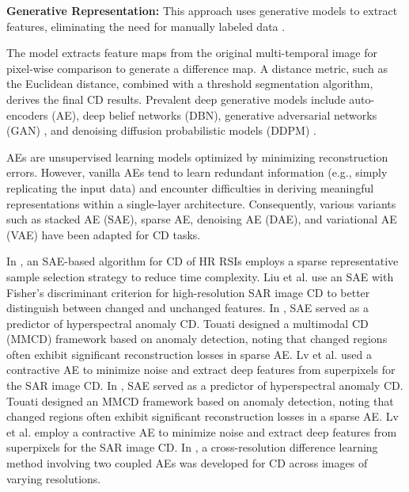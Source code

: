 \textbf{Generative Representation:} This approach uses generative models to extract features, eliminating the need for manually labeled data \cite{hong2024multimodal}.

The model extracts feature maps from the original multi-temporal image for pixel-wise comparison to generate a difference map. A distance metric, such as the Euclidean distance, combined with a threshold segmentation algorithm, derives the final CD results. Prevalent deep generative models include auto-encoders (AE), deep belief networks (DBN), generative adversarial networks (GAN) \cite{Goodfellow2014Generative}, and denoising diffusion probabilistic models (DDPM) \cite{Jonathan2020Denoising}.

\par AEs are unsupervised learning models optimized by minimizing reconstruction errors. However, vanilla AEs tend to learn redundant information (e.g., simply replicating the input data) and encounter difficulties in deriving meaningful representations within a single-layer architecture. Consequently, various variants such as stacked AE (SAE), sparse AE, denoising AE (DAE), and variational AE (VAE) have been adapted for CD tasks.

In \cite{Chen2019Fast}, an SAE-based algorithm for CD of HR RSIs employs a sparse representative sample selection strategy to reduce time complexity. Liu et al. \cite{Liu2019Stacked} use an SAE with Fisher's discriminant criterion for high-resolution SAR image CD to better distinguish between changed and unchanged features. In \cite{Hu2021Hyperspectral}, SAE served as a predictor of hyperspectral anomaly CD. Touati \cite{Touati2020Anomaly} designed a multimodal CD (MMCD) framework based on anomaly detection, noting that changed regions often exhibit significant reconstruction losses in sparse AE. Lv et al. \cite{Lv2018Deep} used a contractive AE to minimize noise and extract deep features from superpixels for the SAR image CD. In \cite{Hu2021Hyperspectral}, SAE served as a predictor of hyperspectral anomaly CD. Touati \cite{Touati2020Anomaly} designed an MMCD framework based on anomaly detection, noting that changed regions often exhibit significant reconstruction losses in a sparse AE. Lv et al. \cite{Lv2018Deep} employ a contractive AE to minimize noise and extract deep features from superpixels for the SAR image CD. In \cite{Zheng2022Unsupervised}, a cross-resolution difference learning method involving two coupled AEs was developed for CD across images of varying resolutions.

